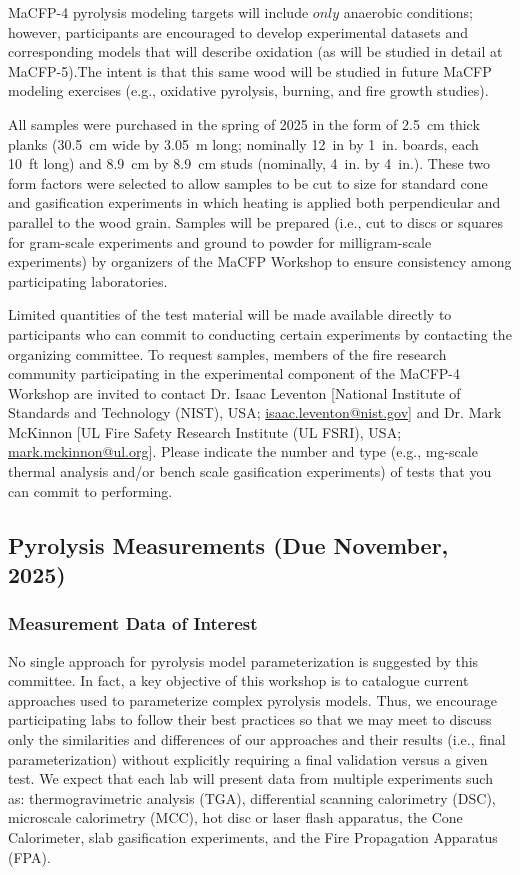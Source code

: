 \documentclass[12pt]{article}
\begin{document}
MaCFP-4 pyrolysis modeling targets will include $only$ anaerobic conditions; however, participants are encouraged to develop experimental datasets and corresponding models that will describe oxidation (as will be studied in detail at MaCFP-5).The intent is that this same wood will be studied in future MaCFP modeling exercises (e.g., oxidative pyrolysis, burning, and fire growth studies).

All samples were purchased in the spring of 2025 in the form of 2.5~cm thick planks (30.5~cm wide by 3.05~m long; nominally 12~in by 1~in. boards, each 10~ft long) and 8.9~cm by 8.9~cm studs (nominally, 4~in. by 4~in.). These two form factors were selected to allow samples to be cut to size for standard cone and gasification experiments in which heating is applied both perpendicular and parallel to the wood grain. Samples will be prepared (i.e., cut to discs or squares for gram-scale experiments and ground to powder for milligram-scale experiments) by organizers of the MaCFP Workshop to ensure consistency among participating laboratories.

Limited quantities of the test material will be made available directly to participants who can commit to conducting certain experiments by contacting the organizing committee. To request samples, members of the fire research community participating in the experimental component of the MaCFP-4 Workshop are invited to contact Dr. Isaac Leventon [National Institute of Standards and Technology (NIST), USA; \href{mailto:isaac.leventon@nist.gov}{isaac.leventon@nist.gov}] and Dr. Mark McKinnon [UL Fire Safety Research Institute (UL FSRI), USA; \href{mailto:mark.mckinnon@ul.org}{mark.mckinnon@ul.org}]. Please indicate the number and type (e.g., mg-scale thermal analysis and/or bench scale gasification experiments) of tests that you can commit to performing.

\subsection{Pyrolysis Measurements (Due November, 2025)}
\label{ssec: Pyrolysis Measurements}
\subsubsection{Measurement Data of Interest}
No single approach for pyrolysis model parameterization is suggested by this committee. In fact, a key objective of this workshop is to catalogue current approaches used to parameterize complex pyrolysis models. Thus, we encourage participating labs to follow their best practices so that we may meet to discuss only the similarities and differences of our approaches and their results (i.e., final parameterization) without explicitly requiring a final validation versus a given test. We expect that each lab will present data from multiple experiments such as: thermogravimetric analysis (TGA), differential scanning calorimetry (DSC), microscale calorimetry (MCC), hot disc or laser flash apparatus, the Cone Calorimeter, slab gasification experiments, and the Fire Propagation Apparatus (FPA).
\end{document}
